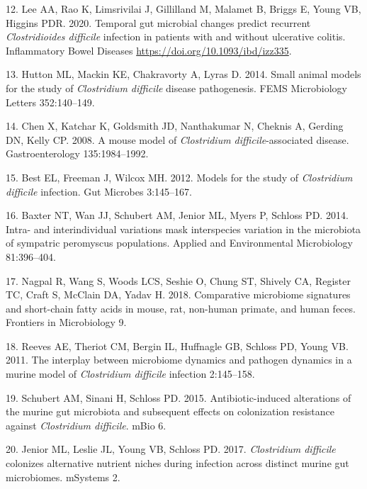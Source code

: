 \documentclass[
  11pt,
]{article}
\begin{document}
\leavevmode\hypertarget{ref-Lee2020}{}%
12. Lee AA, Rao K, Limsrivilai J, Gillilland M, Malamet B, Briggs E,
Young VB, Higgins PDR. 2020. Temporal gut microbial changes predict
recurrent \emph{Clostridioides difficile} infection in patients with and
without ulcerative colitis. Inflammatory Bowel Diseases
\url{https://doi.org/10.1093/ibd/izz335}.

\leavevmode\hypertarget{ref-Hutton2014}{}%
13. Hutton ML, Mackin KE, Chakravorty A, Lyras D. 2014. Small animal
models for the study of \emph{Clostridium difficile} disease
pathogenesis. FEMS Microbiology Letters 352:140--149.

\leavevmode\hypertarget{ref-Chen2008}{}%
14. Chen X, Katchar K, Goldsmith JD, Nanthakumar N, Cheknis A, Gerding
DN, Kelly CP. 2008. A mouse model of \emph{Clostridium
difficile}-associated disease. Gastroenterology 135:1984--1992.

\leavevmode\hypertarget{ref-Best2012}{}%
15. Best EL, Freeman J, Wilcox MH. 2012. Models for the study of
\emph{Clostridium difficile} infection. Gut Microbes 3:145--167.

\leavevmode\hypertarget{ref-Baxter2014}{}%
16. Baxter NT, Wan JJ, Schubert AM, Jenior ML, Myers P, Schloss PD.
2014. Intra- and interindividual variations mask interspecies variation
in the microbiota of sympatric peromyscus populations. Applied and
Environmental Microbiology 81:396--404.

\leavevmode\hypertarget{ref-Nagpal2018}{}%
17. Nagpal R, Wang S, Woods LCS, Seshie O, Chung ST, Shively CA,
Register TC, Craft S, McClain DA, Yadav H. 2018. Comparative microbiome
signatures and short-chain fatty acids in mouse, rat, non-human primate,
and human feces. Frontiers in Microbiology 9.

\leavevmode\hypertarget{ref-Reeves2011}{}%
18. Reeves AE, Theriot CM, Bergin IL, Huffnagle GB, Schloss PD, Young
VB. 2011. The interplay between microbiome dynamics and pathogen
dynamics in a murine model of \emph{Clostridium difficile} infection
2:145--158.

\leavevmode\hypertarget{ref-Schubert2015}{}%
19. Schubert AM, Sinani H, Schloss PD. 2015. Antibiotic-induced
alterations of the murine gut microbiota and subsequent effects on
colonization resistance against \emph{Clostridium difficile}. mBio 6.

\leavevmode\hypertarget{ref-Jenior2017}{}%
20. Jenior ML, Leslie JL, Young VB, Schloss PD. 2017. \emph{Clostridium
difficile} colonizes alternative nutrient niches during infection across
distinct murine gut microbiomes. mSystems 2.
\end{document}
